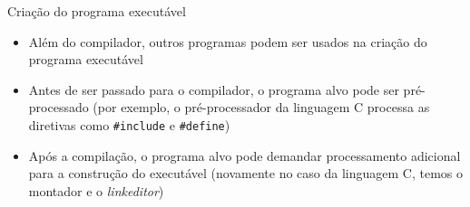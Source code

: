 \begin{frame}[fragile]{Criação do programa executável}

    \begin{itemize}
        \item Além do compilador, outros programas podem ser usados na criação do programa executável

        \item Antes de ser passado para o compilador, o programa alvo pode ser pré-processado (por exemplo, o pré-processador da linguagem C processa as
            diretivas como \texttt{#include} e \texttt{#define})

        \item Após a compilação, o programa alvo pode demandar processamento adicional para a construção do executável (novamente no caso da linguagem C, temos
            o montador e o \textit{linkeditor})

    \end{itemize}

\end{frame}

